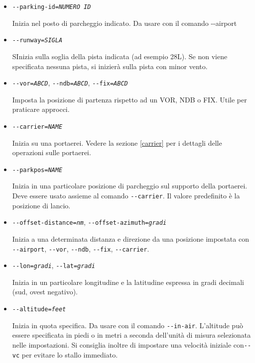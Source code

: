\begin{itemize}
{\begin{itemize}
  \item{\texttt{-$ $-parking-id={\it NUMERO ID}}}

  Inizia nel posto di parcheggio indicato. Da usare con il comando -$ $-airport

  \item{\texttt{-$ $-runway={\it SIGLA}}}

  SInizia sulla soglia della pista indicata (ad esempio 28L). Se non viene
  specificata nessuna pista, si inizier\`{a} sulla pista con minor vento.

  \item{\texttt{-$ $-vor={\it ABCD}}, \texttt{-$ $-ndb={\it ABCD}}, \texttt{-$ $-fix={\it ABCD}}}

  Imposta la posizione di partenza rispetto ad un VOR, NDB o FIX. Utile per praticare approcci.

  \item{\texttt{-$ $-carrier={\it NAME}}}

  Inizia su una portaerei. Vedere la sezione \ref{carrier} per i dettagli delle operazioni sulle portaerei.

  \item{\texttt{-$ $-parkpos={\it NAME}}}

  Inizia in una particolare posizione di parcheggio sul supporto della portaerei.
  Deve essere usato assieme al comando \texttt{-$ $-carrier}.
  Il valore predefinito \`{e} la posizione di lancio.

  \item{\texttt{-$ $-offset-distance={\it nm}}, \texttt{-$ $-offset-azimuth={\it gradi}}}

  Inizia a una determinata distanza e direzione da una posizione impostata con \texttt{-$ $-airport},
  \texttt{-$ $-vor}, \texttt{-$ $-ndb}, \texttt{-$ $-fix}, \texttt{-$ $-carrier}.

  \item{\texttt{-$ $-lon={\it gradi}}, \texttt{-$ $-lat={\it gradi}}}

  Inizia in un particolare longitudine e la latitudine espressa in gradi decimali (sud, ovest negativo).

  \item{\texttt{-$ $-altitude={\it feet}}}

  Inizia in quota specifica. Da usare con il comando \texttt{-$ $-in-air}.
  L'altitude pu\`{o} essere specificata in piedi o in metri a seconda
  dell'unit\`{a} di misura selezionata nelle impostazioni. Si consiglia
  inoltre di impostare una velocit\`{a} iniziale con\texttt{-$ $-vc} per evitare lo stallo immediato.


\end{itemize}}
\end{itemize}

